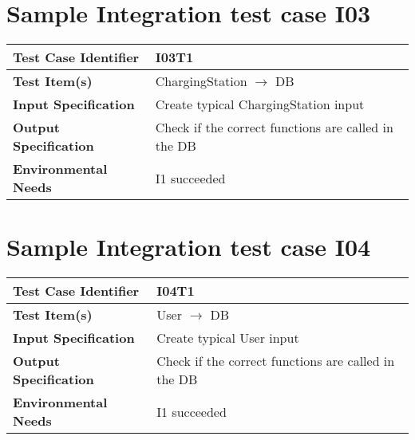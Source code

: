 \section{Sample Integration test case I03}\label{I03}
\begin{center}
	\vspace{0.6cm}
	\begin{tabular}{|l|l|}
		\hline
		\textbf{Test Case Identifier} & I03T1 \bigstrut \\\hline
		\textbf{Test Item(s)} & ChargingStation \ensuremath{\rightarrow} DB \bigstrut \\\hline
		\textbf{Input Specification} & Create typical ChargingStation input \bigstrut \\\hline
		\textbf{Output Specification} & Check if the correct functions are called in the DB \bigstrut \\\hline
		\textbf{Environmental Needs} & I1 succeeded\bigstrut \\\hline
	\end{tabular}
\end{center}

\section{Sample Integration test case I04}\label{I04}
\begin{center}
	\vspace{0.6cm}
	\begin{tabular}{|l|l|}
		\hline
		\textbf{Test Case Identifier} & I04T1 \bigstrut \\\hline
		\textbf{Test Item(s)} & User \ensuremath{\rightarrow} DB \bigstrut \\\hline
		\textbf{Input Specification} & Create typical User input \bigstrut \\\hline
		\textbf{Output Specification} & Check if the correct functions are called in the DB \bigstrut \\\hline
		\textbf{Environmental Needs} & I1 succeeded\bigstrut \\\hline
	\end{tabular}
\end{center}


